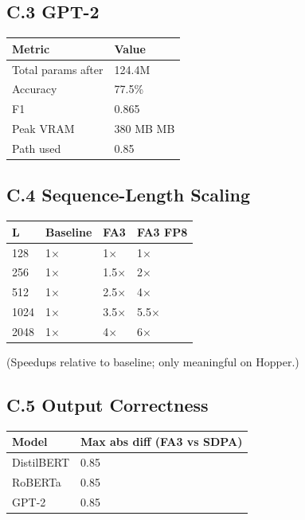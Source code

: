 \subsection{C.3 GPT-2}

\begin{table}[H]
\centering
\small
\begin{tabular}{ll}
\toprule
\textbf{Metric} & \textbf{Value} \\
\midrule
Total params after & 124.4M \\
Accuracy & 77.5\% \\
F1 & 0.865 \\
Peak VRAM & 380 MB MB \\
Path used & 0.85 \\
\bottomrule
\end{tabular}
\end{table}

\subsection{C.4 Sequence-Length Scaling}

\begin{table}[H]
\centering
\small
\begin{tabular}{llll}
\toprule
\textbf{L} & \textbf{Baseline} & \textbf{FA3} & \textbf{FA3 FP8} \\
\midrule
128 & 1$\times$ & 1$\times$ & 1$\times$ \\
256 & 1$\times$ & 1.5$\times$ & 2$\times$ \\
512 & 1$\times$ & 2.5$\times$ & 4$\times$ \\
1024 & 1$\times$ & 3.5$\times$ & 5.5$\times$ \\
2048 & 1$\times$ & 4$\times$ & 6$\times$ \\
\bottomrule
\end{tabular}
\end{table}

(Speedups relative to baseline; only meaningful on Hopper.)

\subsection{C.5 Output Correctness}

\begin{table}[H]
\centering
\small
\begin{tabular}{ll}
\toprule
\textbf{Model} & \textbf{Max abs diff (FA3 vs SDPA)} \\
\midrule
DistilBERT & 0.85 \\
RoBERTa & 0.85 \\
GPT-2 & 0.85 \\
\bottomrule
\end{tabular}
\end{table}

